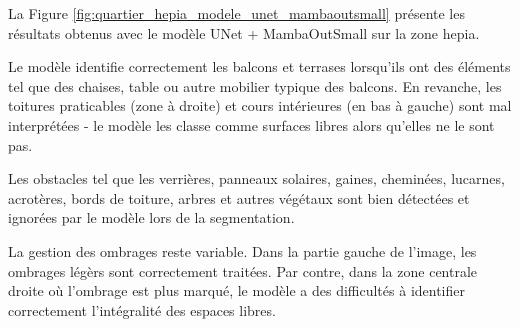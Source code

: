 \newpage
La Figure \ref{fig:quartier_hepia_modele_unet_mambaoutsmall} présente les résultats obtenus avec le modèle UNet + MambaOutSmall sur la zone \acrshort{hepia}.

Le modèle identifie correctement les balcons et terrases lorsqu'ils ont des éléments tel que des chaises, table ou autre mobilier typique des balcons. En revanche, les toitures praticables (zone à droite) et cours intérieures (en bas à gauche) sont mal interprétées - le modèle les classe comme surfaces libres alors qu'elles ne le sont pas.

Les obstacles tel que les verrières, panneaux solaires, gaines, cheminées, lucarnes, acrotères, bords de toiture, arbres et autres végétaux sont bien détectées et ignorées par le modèle lors de la segmentation.

La gestion des ombrages reste variable. Dans la partie gauche de l'image, les ombrages légèrs sont correctement traitées. Par contre, dans la zone centrale droite où l'ombrage est plus marqué, le modèle a des difficultés à identifier correctement l'intégralité des espaces libres.


